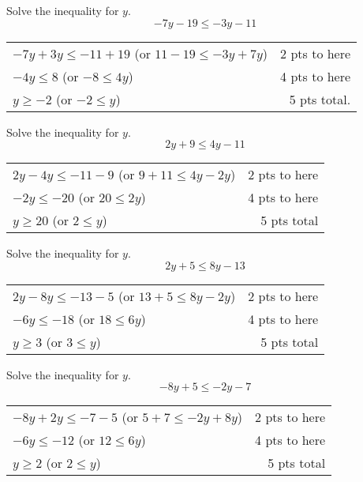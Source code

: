 {
	Solve the inequality for $y$. $$-7y-19 \leq -3y-11$$
}
{
	\begin{tabular}{l r}
	$-7y+3y\leq -11+19$ (or $11-19\leq -3y+7y$) & 2 pts to here \\
	$-4y\leq 8$ (or $-8\leq 4y$) & 4 pts to here \\
	$y \geq -2$ (or $-2\leq y$)  & 5 pts total.
	\end{tabular}
}

{
	Solve the inequality for $y$. $$2y+9\leq 4y-11$$
}
{
	\begin{tabular}{l r}
	$2y-4y\leq -11-9$ (or $9+11\leq 4y-2y$)& 2 pts to here\\
	$-2y\leq -20$ (or $20\leq 2y$)& 4 pts to here\\
	$y\geq 20$ (or $2\leq y$) & 5 pts total
	\end{tabular}
}

{
	Solve the inequality for $y$. $$2y+5\leq 8y-13$$
}
{
	\begin{tabular}{l r}
	$2y-8y\leq -13-5$ (or $13+5\leq 8y-2y$)  & 2 pts to here\\
	$-6y\leq -18$ (or $18\leq 6y$) & 4 pts to here\\
	$y\geq 3$ (or $3\leq y$)& 5 pts total
	\end{tabular}
}

{
	Solve the inequality for $y$. $$-8y+5\leq-2y-7$$
}
{
	\begin{tabular}{l r}
	$-8y+2y\leq -7-5$ (or $5+7\leq -2y+8y$)& 2 pts to here\\
	$-6y \leq -12$ (or $12\leq 6y$)& 4 pts to here\\
	$y\geq 2 $ (or $2\leq y$)& 5 pts total
	\end{tabular}
}
